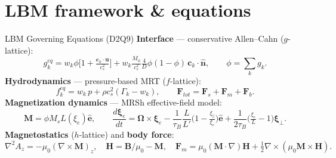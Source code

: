 \documentclass[aspectratio=43,10pt]{beamer}
\begin{document}
\section{LBM framework \& equations}

\begin{frame}{LBM Governing Equations (D2Q9)}
  \small
  \textbf{Interface} --- conservative Allen--Cahn ($g$-lattice):
  \[
    g_k^{eq}=w_k\phi\Big[1+\tfrac{\bm c_k\cdot\bm u}{c_s^2}\Big]
      +w_k\tfrac{M_\phi}{c_s^2}\tfrac{4}{D}\phi(1-\phi)\,\bm c_k\cdot\hat{\bm n},\qquad \phi=\textstyle\sum_k g_k .
  \]
  \textbf{Hydrodynamics} --- pressure-based MRT ($f$-lattice):
  \[
    f_k^{eq}=w_k\,p+\rho c_s^2(\Gamma_k-w_k),\qquad \bm F_{tot}=\bm F_s+\bm F_m+\bm F_b .
  \]
  \textbf{Magnetization dynamics} --- MRSh effective-field model:
  \[
    \bm M=\phi M_s L(\xi_e)\hat{\bm e},\qquad
    \frac{d\bm\xi_e}{dt}=\bm\Omega\times\bm\xi_e-\frac{1}{\tau_B}\frac{L}{L'}\!\Big(1-\tfrac{\xi_\parallel}{\xi_e}\Big)\hat{\bm e}+\frac{1}{2\tau_B}\Big(\tfrac{\xi_e}{L}-1\Big)\bm\xi_\perp .
  \]
  \textbf{Magnetostatics} ($h$-lattice) and \textbf{body force}:
  \[
    \nabla^2 A_z=-\mu_0(\nabla\times\bm M)_z,\quad \bm H=\bm B/\mu_0-\bm M,\quad
    \bm F_m=\mu_0(\bm M\cdot\nabla)\bm H+\tfrac12\nabla\times(\mu_0\bm M\times\bm H).
  \]
\end{frame}
\end{document}
